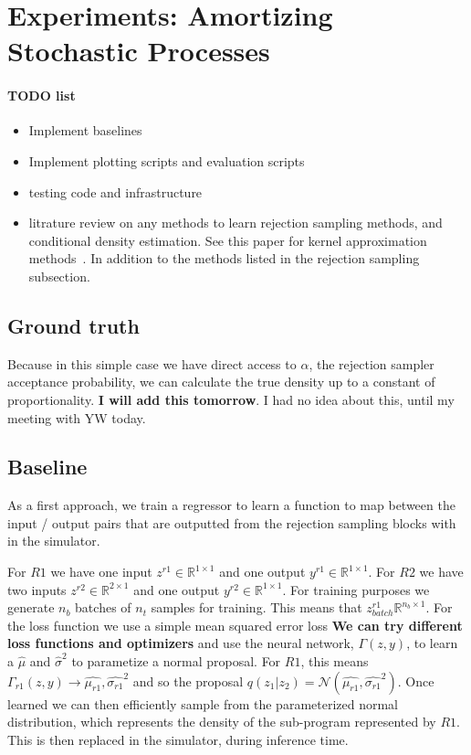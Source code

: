 \documentclass{article}
\begin{document}
\section{Experiments: Amortizing Stochastic Processes}

\paragraph{TODO list}
\begin{itemize}
  \item Implement baselines
  \item Implement plotting scripts and evaluation scripts
  \item testing code and infrastructure
  \item litrature review on any methods to learn rejection sampling methods, 
  and conditional density estimation. See this paper for kernel approximation 
  methods~\cite{erraqabi2016pliable}. In addition to the methods listed in the 
  rejection sampling subsection. 
\end{itemize}
\subsection{Ground truth}

Because in this simple case we have direct access to $\alpha$, the rejection sampler acceptance probability,
we can calculate the true density up to a constant of proportionality. 
\textbf{I will add this tomorrow}. I had no idea about this, until my meeting with 
YW today. 

\subsection{Baseline}
As a first approach, we train a regressor to learn a function to map
between the input / output pairs that are outputted from the rejection
sampling blocks with in the simulator. 

For $R1$ we have one input $z^{r1} \in \mathbb{R}^{1 \times 1}$ and one output $y^{r1} \in \mathbb{R}^{1 \times 1}$.
For $R2$ we have two inputs $z^{r2} \in \mathbb{R}^{2 \times 1}$ and one output $y^{r2} \in \mathbb{R}^{1 \times 1}$.
For training purposes we generate $n_{b}$ batches of $n_{t}$ samples for training. 
This means that $z^{r1}_{batch}\mathbb{R}^{n_{b} \times 1}$. 
For the loss function we use a simple mean squared error loss \textbf{We can try different loss 
functions and optimizers} and use the
neural network, $\Gamma(z, y)$, to learn a $\hat{\mu}$ and $\hat{\sigma}^{2}$ to parametize 
a normal proposal. For $R1$, this means $\Gamma_{r1}(z,y) \rightarrow \hat{\mu_{r1}},  \hat{\sigma_{r1}}^{2}$  
and so the proposal $q(z_{1} | z_{2}) = \mathcal{N}(\hat{\mu_{r1}},  \hat{\sigma_{r1}}^{2})$. 
Once learned we can then efficiently sample from the parameterized normal distribution, which
represents the density of the sub-program represented by $R1$. 
This is then replaced in the simulator, during inference time. 
\end{document}
